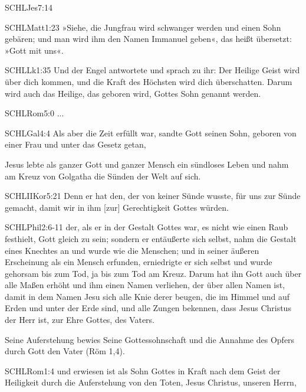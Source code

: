 \documentclass{../../inc/mybib}
\begin{document}
\begin{spacing}{1.5}
\begin{enumerate}
\begin{bibelbox}{SCHL}{Jes}{7:14}
    \end{bibelbox}   
    \begin{bibelbox}{SCHL}{Matt}{1:23}
        »Siehe, die Jungfrau wird schwanger werden und einen Sohn gebären; und man wird ihm den Namen Immanuel geben«, das heißt übersetzt: »Gott mit uns«.
    \end{bibelbox}   
    \begin{bibelbox}{SCHL}{Lk}{1:35}
        Und der Engel antwortete und sprach zu ihr: Der Heilige Geist wird über dich kommen, und die Kraft des Höchsten wird dich überschatten. Darum wird auch das Heilige, das geboren wird, Gottes Sohn genannt werden.
    \end{bibelbox}   
    \begin{bibelbox}{SCHL}{Rom}{5:0}
        ...
    \end{bibelbox}   
    \begin{bibelbox}{SCHL}{Gal}{4:4}
        Als aber die Zeit erfüllt war, sandte Gott seinen Sohn, geboren von einer Frau und unter das Gesetz getan,
    \end{bibelbox}   
        Jesus lebte als ganzer Gott und ganzer Mensch ein sündloses Leben und nahm am Kreuz von Golgatha die Sünden der Welt auf sich.
    \begin{bibelbox}{SCHL}{IIKor}{5:21}
        Denn er hat den, der von keiner Sünde wusste, für uns zur Sünde gemacht, damit wir in ihm [zur] Gerechtigkeit Gottes würden. 
    \end{bibelbox}
    \begin{bibelbox}{SCHL}{Phil}{2:6-11}
        der, als er in der Gestalt Gottes war, es nicht wie einen Raub festhielt, Gott gleich zu sein; sondern er entäußerte sich selbst, nahm die Gestalt eines Knechtes an und wurde wie die Menschen; und in seiner äußeren Erscheinung als ein Mensch erfunden, erniedrigte er sich selbst und wurde gehorsam bis zum Tod, ja bis zum Tod am Kreuz. Darum hat ihn Gott auch über alle Maßen erhöht und ihm einen Namen verliehen, der über allen Namen ist, damit in dem Namen Jesu sich alle Knie derer beugen, die im Himmel und auf Erden und unter der Erde sind, und alle Zungen bekennen, dass Jesus Christus der Herr ist, zur Ehre Gottes, des Vaters. 
    \end{bibelbox}
    Seine Auferstehung bewies Seine Gottessohnschaft und die Annahme des Opfers durch Gott den Vater (Röm 1,4). 
    \begin{bibelbox}{SCHL}{Rom}{1:4}
        und erwiesen ist als Sohn Gottes in Kraft nach dem Geist der Heiligkeit durch die Auferstehung von den Toten, Jesus Christus, unseren Herrn,

\end{bibelbox}
\end{enumerate}
\end{spacing}
\end{document}

